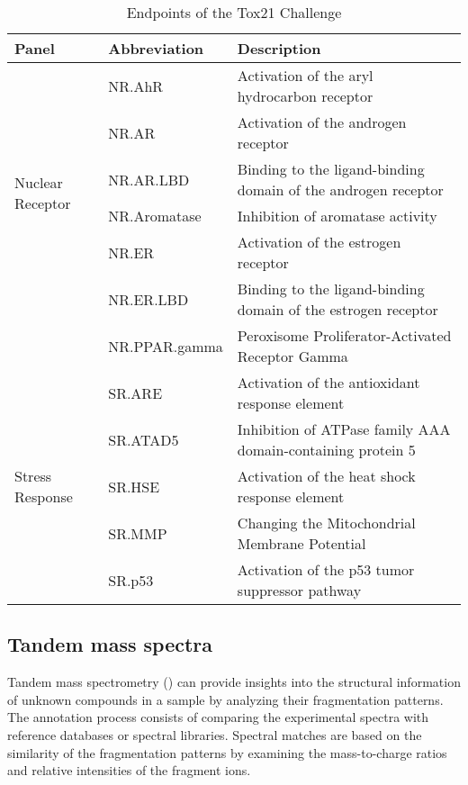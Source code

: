 \begin{table}[htbp]
\centering
\footnotesize
\caption{Endpoints of the Tox21 Challenge}
\label{table:tox21_endpoints}
\begin{tabular}{l l p{6cm}}
\hline
Panel & Abbreviation & Description \\
\hline
\multirow{6}{*}{Nuclear Receptor} & NR.AhR & Activation of the aryl hydrocarbon receptor \\
& NR.AR & Activation of the androgen receptor \\
& NR.AR.LBD & Binding to the ligand-binding domain of the androgen receptor \\
& NR.Aromatase & Inhibition of aromatase activity \\
& NR.ER & Activation of the estrogen receptor \\
& NR.ER.LBD & Binding to the ligand-binding domain of the estrogen receptor \\
& NR.PPAR.gamma & Peroxisome Proliferator-Activated Receptor Gamma  \\
\hline
\multirow{6}{*}{Stress Response} & SR.ARE & Activation of the antioxidant response element \\
& SR.ATAD5 & Inhibition of ATPase family AAA domain-containing protein 5 \\
& SR.HSE & Activation of the heat shock response element \\
& SR.MMP & Changing the Mitochondrial Membrane Potential \\
& SR.p53 & Activation of the p53 tumor suppressor pathway \\
\hline
\end{tabular}
\end{table}



\subsection*{Tandem mass spectra}

Tandem mass spectrometry (\tMS{}) can provide insights into the structural information of unknown compounds in a sample by analyzing their fragmentation patterns. The annotation process consists of comparing the experimental \tMS{} spectra with reference databases or spectral libraries. Spectral matches are based on the similarity of the fragmentation patterns by examining the mass-to-charge ratios and relative intensities of the fragment ions.  

